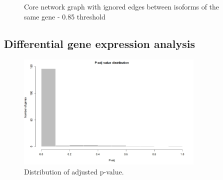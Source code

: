 \documentclass[journal]{IEEEtran}
\begin{document}
\begin{figure}[!ht]
    \centering
    \caption{Core network graph with ignored edges between isoforms of the same gene - 0.85 threshold}\label{fig:core_graph_ignored}
\end{figure}

\clearpage
\newpage

\subsection{Differential gene expression analysis}
\begin{figure}[!ht]
    \centering
    \includegraphics[width=0.8\textwidth]{images/DE/pvalueDE.jpg}
    \caption{Distribution of adjusted p-value.}
    \label{fig:pvalueDE}
\end{figure}
\end{document}
